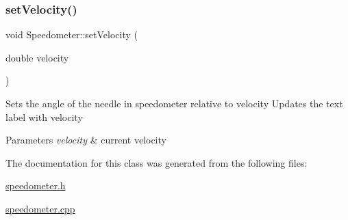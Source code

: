 \mbox{\label{class_speedometer_ad52da130f27de310b251caea15590f7f}} 
\subsubsection{\texorpdfstring{setVelocity()}{setVelocity()}}
{\footnotesize\ttfamily void Speedometer\+::set\+Velocity (\begin{DoxyParamCaption}\item[{double}]{velocity }\end{DoxyParamCaption})}

Sets the angle of the needle in speedometer relative to velocity Updates the text label with velocity 
\begin{DoxyParams}{Parameters}
{\em velocity} & current velocity \\
\hline
\end{DoxyParams}


The documentation for this class was generated from the following files\+:\begin{DoxyCompactItemize}
\item 
\mbox{\hyperlink{speedometer_8h}{speedometer.\+h}}\item 
\mbox{\hyperlink{speedometer_8cpp}{speedometer.\+cpp}}\end{DoxyCompactItemize}
